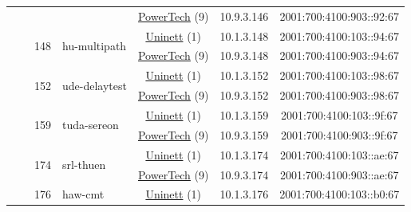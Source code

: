 \begin{small}
\begin{center}
\begin{longtable}{|c|c|c|c|c|c|c|c|}
  &  &  &  & \multicolumn{2}{|c|}{\tiny{\href{http://www.powertech.no}{PowerTech} (9)}} & \tiny{10.9.3.146} & \tiny{2001:700:4100:903::92:67} \\* \cline{3-3}\cline{4-4}\cline{5-5}\cline{6-6}\cline{7-7}\cline{8-8}
  &  & \multirow{2}{*}{\tiny{148}} & \multicolumn{1}{|l|}{\multirow{2}{*}{\tiny{hu-multipath}}} & \multicolumn{2}{|c|}{\tiny{\href{https://www.uninett.no}{Uninett} (1)}} & \tiny{10.1.3.148} & \tiny{2001:700:4100:103::94:67} \\* \cline{5-5}\cline{6-6}\cline{7-7}\cline{8-8}
  &  &  &  & \multicolumn{2}{|c|}{\tiny{\href{http://www.powertech.no}{PowerTech} (9)}} & \tiny{10.9.3.148} & \tiny{2001:700:4100:903::94:67} \\* \cline{3-3}\cline{4-4}\cline{5-5}\cline{6-6}\cline{7-7}\cline{8-8}
  &  & \multirow{2}{*}{\tiny{152}} & \multicolumn{1}{|l|}{\multirow{2}{*}{\tiny{ude-delaytest}}} & \multicolumn{2}{|c|}{\tiny{\href{https://www.uninett.no}{Uninett} (1)}} & \tiny{10.1.3.152} & \tiny{2001:700:4100:103::98:67} \\* \cline{5-5}\cline{6-6}\cline{7-7}\cline{8-8}
  &  &  &  & \multicolumn{2}{|c|}{\tiny{\href{http://www.powertech.no}{PowerTech} (9)}} & \tiny{10.9.3.152} & \tiny{2001:700:4100:903::98:67} \\* \cline{3-3}\cline{4-4}\cline{5-5}\cline{6-6}\cline{7-7}\cline{8-8}
  &  & \multirow{2}{*}{\tiny{159}} & \multicolumn{1}{|l|}{\multirow{2}{*}{\tiny{tuda-sereon}}} & \multicolumn{2}{|c|}{\tiny{\href{https://www.uninett.no}{Uninett} (1)}} & \tiny{10.1.3.159} & \tiny{2001:700:4100:103::9f:67} \\* \cline{5-5}\cline{6-6}\cline{7-7}\cline{8-8}
  &  &  &  & \multicolumn{2}{|c|}{\tiny{\href{http://www.powertech.no}{PowerTech} (9)}} & \tiny{10.9.3.159} & \tiny{2001:700:4100:903::9f:67} \\* \cline{3-3}\cline{4-4}\cline{5-5}\cline{6-6}\cline{7-7}\cline{8-8}
  &  & \multirow{2}{*}{\tiny{174}} & \multicolumn{1}{|l|}{\multirow{2}{*}{\tiny{srl-thuen}}} & \multicolumn{2}{|c|}{\tiny{\href{https://www.uninett.no}{Uninett} (1)}} & \tiny{10.1.3.174} & \tiny{2001:700:4100:103::ae:67} \\* \cline{5-5}\cline{6-6}\cline{7-7}\cline{8-8}
  &  &  &  & \multicolumn{2}{|c|}{\tiny{\href{http://www.powertech.no}{PowerTech} (9)}} & \tiny{10.9.3.174} & \tiny{2001:700:4100:903::ae:67} \\* \cline{3-3}\cline{4-4}\cline{5-5}\cline{6-6}\cline{7-7}\cline{8-8}
  &  & \multirow{2}{*}{\tiny{176}} & \multicolumn{1}{|l|}{\multirow{2}{*}{\tiny{haw-cmt}}} & \multicolumn{2}{|c|}{\tiny{\href{https://www.uninett.no}{Uninett} (1)}} & \tiny{10.1.3.176} & \tiny{2001:700:4100:103::b0:67} \\* \cline{5-5}\cline{6-6}\cline{7-7}\cline{8-8}

\end{longtable}
\end{center}
\end{small}
